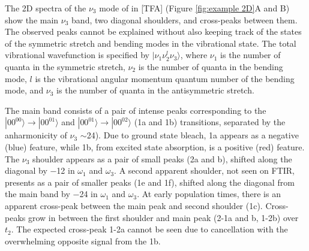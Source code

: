 The 2D spectra of the $\nu_3$ mode of  in \ce{[Im_{4,1}]}[TFA] (Figure \ref{fig:example 2D}A and B) show the main $\nu_3$ band, two diagonal shoulders, and cross-peaks between them. The observed peaks cannot be explained without also keeping track of the states of the  symmetric stretch and bending modes in the vibrational state. The total vibrational wavefunction is specified by $|\nu_1 \nu_2^l \nu_3 \rangle$, where $\nu_1$ is the number of quanta in the symmetric stretch, $\nu_2$ is the number of quanta in the bending mode, $l$ is the vibrational angular momentum quantum number of the bending mode, and $\nu_3$ is the number of quanta in the antisymmetric stretch.

The main band consists of a pair of intense peaks corresponding to the $|00^00\rangle\rightarrow|00^01\rangle$  and $|00^01\rangle\rightarrow|00^02\rangle$ (1a and 1b) transitions, separated by the anharmonicity of $\nu_3$ $\sim$\SI{24}{\wavenumber}). Due to ground state bleach, 1a appears as a negative (blue) feature, while 1b, from excited state absorption, is a positive (red) feature. The $\nu_3$ shoulder appears as a pair of small peaks (2a and b), shifted along the diagonal by \SI{-12}{\wavenumber} in $\omega_1$ and $\omega_3$. A second apparent shoulder, not seen on FTIR, presents as a pair of smaller peaks (1e and 1f), shifted along the diagonal from the main band by \SI{-24}{\wavenumber} in $\omega_1$ and $\omega_3$. At early population times, there is an apparent cross-peak between the main peak and second shoulder (1c). Cross-peaks grow in between the first shoulder and main peak (2-1a and b, 1-2b) over $t_2$. The expected cross-peak 1-2a cannot be seen due to cancellation with the overwhelming opposite signal from the 1b.

